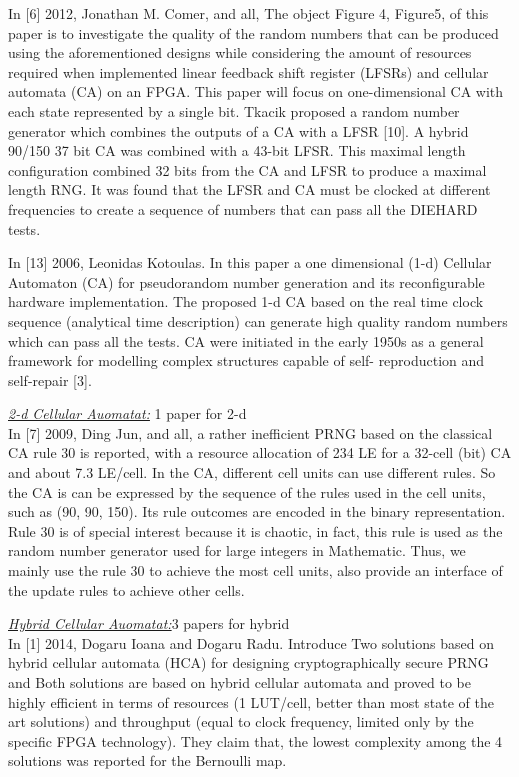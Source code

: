 In [6] 2012, Jonathan M. Comer, and all, The object Figure 4, Figure5, of this paper is to investigate the quality of the random numbers that can be produced using the aforementioned designs while considering the amount of resources required when implemented linear feedback shift register (LFSRs) and cellular automata (CA) on an FPGA. This paper will focus on one-dimensional CA with each state represented by a single bit. Tkacik proposed a random number generator which combines the outputs of a CA with a LFSR [10]. A hybrid 90/150 37 bit CA was combined with a 43-bit LFSR. This maximal length configuration combined 32 bits from the CA and LFSR to produce a maximal length RNG. It was found that the LFSR and CA must be clocked at different frequencies to create a sequence of numbers that can pass all the DIEHARD tests.

In [13] 2006, Leonidas Kotoulas. In this paper a one dimensional (1-d) Cellular Automaton (CA) for pseudorandom number generation and its reconfigurable hardware implementation. The proposed 1-d CA based on the real time clock sequence (analytical time description) can generate high quality random numbers which can pass all the tests. CA were initiated in the early 1950s as a general framework for modelling complex structures capable of self- reproduction and self-repair [3]. 

\underline{\textit{2-d Cellular Auomatat:}} 1 paper for 2-d \\
In [7] 2009, Ding Jun, and all, a rather inefficient PRNG based on the classical CA rule 30 is reported, with a resource allocation of 234 LE for a 32-cell (bit) CA and about 7.3 LE/cell. In the CA, different cell units can use different rules. So the CA is can be expressed by the sequence of the rules used in the cell units, such as (90, 90, 150). Its rule outcomes are encoded in the binary representation.  Rule 30 is of special interest because it is chaotic, in fact, this rule is used as the random number generator used for large integers in Mathematic. Thus, we mainly use the rule 30 to achieve the most cell units, also provide an interface of the update rules to achieve other cells. 

\underline{\textit{Hybrid Cellular Auomatat:}}3 papers for hybrid\\
In [1] 2014, Dogaru Ioana and Dogaru Radu. Introduce Two solutions based on hybrid cellular automata (HCA) for designing cryptographically secure PRNG and Both solutions are based on hybrid cellular automata and proved to be highly efficient in terms of resources (1 LUT/cell, better than most state of the art solutions) and throughput (equal to clock frequency, limited only by the specific FPGA technology). 
They claim that, the lowest complexity among the 4 solutions was reported for the Bernoulli map.


